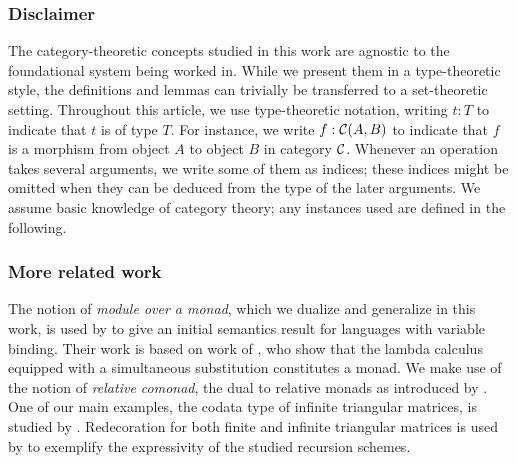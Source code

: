 \documentclass[envcountsame]{llncs}
\begin{document}
 
 
 \subsubsection*{Disclaimer}The category-theoretic concepts studied in this work are agnostic to the foundational system being worked in.
 While we present them in a type-theoretic style, the definitions and lemmas can trivially be transferred to a set-theoretic setting.
 Throughout this article, we use type-theoretic notation,  writing $t:T$ to indicate that $t$ is of type $T$. 
 For instance, we write $f : {\mathcal{C}}(A,B)$ to indicate that $f$ is a morphism from object $A$ to object $B$ in category ${\mathcal{C}}$.
 Whenever an operation takes several arguments, we write some of them as indices; these indices might be omitted when 
 they can be deduced from the type of the later arguments.
 We assume basic knowledge of category theory; any instances used are defined in the following.
  
 \subsubsection*{More related work}
 The notion of \emph{module over a monad}, which we dualize and generalize in this work, is used by \textcite{DBLP:journals/iandc/HirschowitzM10}
 to give an initial semantics result for languages with variable binding. 
 Their work is based on work of \textcite{alt_reus},
 who show that the lambda calculus equipped with a simultaneous substitution constitutes a monad.
 We make use of the notion of \emph{relative comonad}, the dual to relative monads as introduced by \textcite{DBLP:conf/fossacs/AltenkirchCU10}.
 One of our main examples, the codata type of infinite triangular matrices, is studied by \textcite{DBLP:conf/types/MatthesP11}.
 Redecoration for both finite and infinite triangular matrices is used by \textcite{DBLP:journals/tcs/AbelMU05} to exemplify 
 the expressivity of the studied recursion schemes.
 
\end{document}
